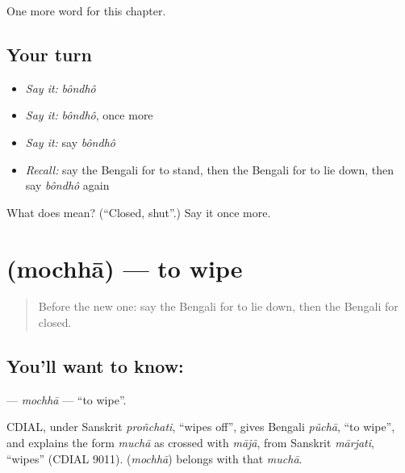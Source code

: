 \begin{grammarlens}[title={What you've built}]
One more word for this chapter.
\end{grammarlens}

\subsection*{Your turn}
\begin{itemize}
\raggedright
  \item \emph{Say it:} \emph{bôndhô}
  \item \emph{Say it:} \emph{bôndhô}, once more
  \item \emph{Say it:} say \emph{bôndhô}
  \item \emph{Recall:} say the Bengali for to stand, then the Bengali for to lie down, then say \emph{bôndhô} again
\end{itemize}

\begin{tcolorbox}[breakable,colback=teal!4,colframe=teal!35!black,title={Before you move on}]
What does  mean? (\textquotedblleft{}Closed, shut\textquotedblright{}.) Say it once more.
\end{tcolorbox}
\section[\texorpdfstring{\bn{মোছা} (mochhā)}{মোছা (mochhā)}]{ (mochhā) — to wipe}

\label{lesson:BN-C104-mochha}



\begin{quote}
Before the new one: say the Bengali for to lie down, then the Bengali for closed.
\end{quote}

\subsection*{You'll want to know: }
\textbf{} — \emph{mochhā} — \textquotedblleft{}to wipe\textquotedblright{}.

\begin{cousinweb}
CDIAL, under Sanskrit \emph{proñchati}, \textquotedblleft{}wipes off\textquotedblright{}, gives Bengali \emph{pũchā}, \textquotedblleft{}to wipe\textquotedblright{}, and explains the form \emph{muchā} as crossed with \emph{mājā}, from Sanskrit \emph{mārjati}, \textquotedblleft{}wipes\textquotedblright{} (CDIAL 9011). \textbf{} (\emph{mochhā}) belongs with that \emph{muchā}.
\end{cousinweb}


